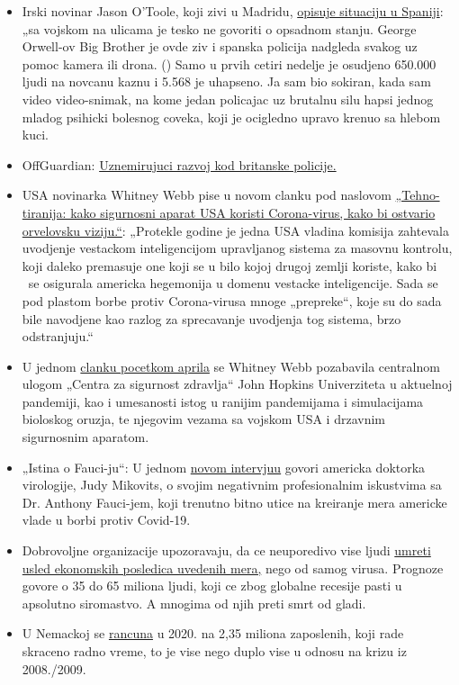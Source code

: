 \begin{itemize}
\item
  Irski novinar Jason O'Toole, koji zivi u Madridu,
  \href{https://www.rt.com/op-ed/486350-spain-tough-rules-covid-19-lockdown/}{opisuje
  situaciju u Spaniji}: „sa vojskom na ulicama je tesko ne govoriti o
  opsadnom stanju. George Orwell-ov Big Brother je ovde ziv i spanska
  policija nadgleda svakog uz pomoc kamera ili drona. () Samo u prvih
  cetiri nedelje je osudjeno 650.000 ljudi na novcanu kaznu i 5.568 je
  uhapseno. Ja sam bio sokiran, kada sam video video-snimak, na kome
  jedan policajac uz brutalnu silu hapsi jednog mladog psihicki bolesnog
  coveka, koji je ocigledno upravo krenuo sa hlebom kuci.
\item
  OffGuardian:
  \href{https://off-guardian.org/2020/04/18/the-disturbing-developments-in-uk-policing/}{Uznemirujuci
  razvoj kod britanske policije.}
\item
  USA novinarka Whitney Webb pise u novom clanku pod naslovom
  \href{https://www.thelastamericanvagabond.com/top-news/techno-tyranny-how-us-national-security-state-using-coronavirus-fulfill-orwellian-vision/}{„Tehno-tiranija:
  kako sigurnosni aparat USA koristi Corona-virus, kako bi ostvario
  orvelovsku viziju.``}: „Protekle godine je jedna USA vladina komisija
  zahtevala uvodjenje vestackom inteligencijom upravljanog sistema za
  masovnu kontrolu, koji daleko premasuje one koji se u bilo kojoj
  drugoj zemlji koriste, kako bi ~se osigurala americka hegemonija u
  domenu vestacke inteligencije. Sada se pod plastom borbe protiv
  Corona-virusa mnoge „prepreke``, koje su do sada bile navodjene kao
  razlog za sprecavanje uvodjenja tog sistema, brzo odstranjuju.``
\item
  U jednom
  \href{https://www.thelastamericanvagabond.com/top-news/all-roads-lead-dark-winter/}{clanku
  pocetkom aprila} se Whitney Webb pozabavila centralnom ulogom „Centra
  za sigurnost zdravlja`` John Hopkins Univerziteta u aktuelnoj
  pandemiji, kao i umesanosti istog u ranijim pandemijama i simulacijama
  bioloskog oruzja, te njegovim vezama sa vojskom USA i drzavnim
  sigurnosnim aparatom.
\item
  „Istina o Fauci-ju``: U jednom
  \href{https://childrenshealthdefense.org/news/the-truth-about-fauci-featuring-dr-judy-mikovits/}{novom
  intervjuu} govori americka doktorka virologije, Judy Mikovits, o
  svojim negativnim profesionalnim iskustvima sa Dr. Anthony Fauci-jem,
  koji trenutno bitno utice na kreiranje mera americke vlade u borbi
  protiv Covid-19.
\item
  Dobrovoljne organizacije upozoravaju, da ce neuporedivo vise ljudi
  \href{https://www.welt.de/wirtschaft/article207092745/Corona-Pandemie-Rezession-beschert-der-Welt-die-noch-groessere-Katastrophe.html}{umreti
  usled ekonomskih posledica uvedenih mera,} nego od samog virusa.
  Prognoze govore o 35 do 65 miliona ljudi, koji ce zbog globalne
  recesije pasti u apsolutno siromastvo. A mnogima od njih preti smrt od
  gladi.
\item
  U Nemackoj se
  \href{https://www.boeckler.de/pdf/p_wsi_pb_38_2020.pdf}{rancuna} u
  2020. na 2,35 miliona zaposlenih, koji rade skraceno radno vreme, to
  je vise nego duplo vise u odnosu na krizu iz 2008./2009.
\end{itemize}

